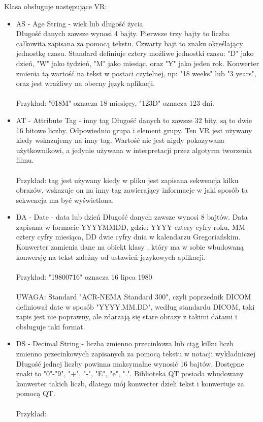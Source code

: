 Klasa obsługuje następujące VR:
\begin{itemize}
    \item AS - Age String - wiek lub długość życia\\
    Długość danych zawsze wynosi 4 bajty.
    Pierwsze trzy bajty to liczba całkowita zapisana za pomocą tekstu.
    Czwarty bajt to znaku określający jednostkę czasu.
    Standard definiuje cztery możliwe jednostki czasu: "D" jako dzień, "W" jako tydzień, "M" jako miesiąc, oraz "Y" jako jeden rok.
    Konwerter zmienia tą wartość na tekst w postaci czytelnej, np: "18 weeks" lub "3 years", oraz jest wrażliwy na obecny język aplikacji.
    \\\\
    Przykład: "018M" oznacza 18 miesięcy, "123D" oznacza 123 dni.

    \item AT - Attribute Tag - inny tag
    Długość danych to zawsze 32 bity, są to dwie 16 bitowe liczby.
    Odpowiednio grupa i element grupy.
    Ten VR jest używany kiedy wskazujemy na inny tag.
    Wartość nie jest nigdy pokazywana użytkownikowi, a jedynie używana w interpretacji przez algotyrm tworzenia filmu.
    \\\\
    Przykład: tag  jest używany kiedy w pliku jest zapisana sekwencja kilku obrazów, wskazuje on na inny tag zawierający informacje w jaki sposób ta sekwencja ma być wyświetlona.
    
    \item DA - Date - data lub dzień
    Długość danych zawsze wynosi 8 bajtów.
    Data zapisana w formacie YYYYMMDD, gdzie: YYYY cztery cyfry roku, MM cztery cyfry miesiąca, DD dwie cyfry dnia w kalendarzu Gregoriańskim.
    Konwerter zamienia dane na obiekt klasy , który ma w sobie wbudowaną konwersję na tekst zależny od ustawień językowych aplikacji.
    \\\\
    Przykład: "19800716" oznacza 16 lipca 1980
    \\\\
    UWAGA: Standard "ACR-NEMA Standard 300", czyli poprzednik DICOM definiował date w sposób "YYYY.MM.DD", według standardu DICOM, taki zapis jest nie poprawny, ale zdarzają się stare obrazy z takimi datami i  obsługuje taki format.

    \item DS - Decimal String - liczba zmienno przecinkowa lub ciąg kilku liczb zmienno przecinkowych zapisanych za pomocą tekstu w notacji wykładniczej
    Długość jednej liczby powinna maksymalne wynosić 16 bajtów.
    Dostępne znaki to "0"-"9", "+", "-", "E", "e", ".".
    Biblioteka QT posiada wbudowany konwerter takich liczb, dlatego mój konwerter dzieli tekst i konwertuje za pomocą QT.
    \\\\
    Przykład:


\end{itemize}

